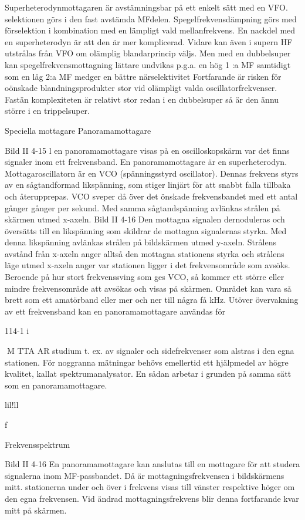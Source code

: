 Superheterodynmottagaren är avstämningsbar på ett enkelt sätt med en VFO.
selektionen görs i den fast avstämda MFdelen. Spegelfrekvensdämpning görs med
förselektion i kombination med en lämpligt
vald mellanfrekvens.
En nackdel med en superheterodyn är
att den är mer komplicerad. Vidare kan även
i supern HF utstrålas från VFO om olämplig
blandarprincip väljs.
Men med en dubbelsuper kan spegelfrekvensmottagning lättare undvikas p.g.a.
en hög 1 :a MF samtidigt som en låg 2:a MF
medger en bättre närselektivitet
Fortfarande är risken för oönskade blandningsprodukter stor vid olämpligt valda oscillatorfrekvenser.
Fastän komplexiteten är relativt stor redan i en dubbelsuper så är den ännu större
i en trippelsuper.

Speciella mottagare
Panoramamottagare

Bild II 4-15
l en panoramamottagare visas på en oscilloskopskärm var det finns signaler inom ett
frekvensband. En panoramamottagare är
en superheterodyn. Mottagaroscillatorn är
en VCO (spänningsstyrd oscillator). Dennas frekvens styrs av en sågtandformad
likspänning, som stiger linjärt för att snabbt
falla tillbaka och återupprepas. VCO sveper
då över det önskade frekvensbandet med
ett antal gånger gånger per sekund. Med
samma sågtandspänning avlänkas strålen
på skärmen utmed x-axeln. Bild II 4-16
Den mottagna signalen dernoduleras och
översätts till en likspänning som skildrar de
mottagna signalernas styrka. Med denna
likspänning avlänkas strålen på bildskärmen utmed y-axeln. Strålens avstånd från
x-axeln anger alltså den mottagna stationens styrka och strålens läge utmed x-axeln
anger var stationen ligger i det frekvensområde som avsöks. Beroende på hur stort
frekvenssving som ges VCO, så kommer ett
större eller mindre frekvensområde att
avsökas och visas på skärmen. Området
kan vara så brett som ett amatörband eller
mer och ner till några få kHz.
Utöver övervakning av ett frekvensband
kan en panoramamottagare användas för

114-1 i

M TTA AR
studium t. ex. av signaler och sidefrekvenser
som alstras i den egna stationen. För noggranna mätningar behövs emellertid ett hjälpmedel av högre kvalitet, kallat spektrumanalysator. En sådan arbetar i grunden på
samma sätt som en panoramamottagare.

lil!ll

f

Frekvensspektrum

Bild II 4-16
En panoramamottagare kan anslutas till en
mottagare för att studera signalerna inom
MF-passbandet. Då är mottagningsfrekvensen i bildskärmens mitt. stationerna under
och över i frekvens visas till vänster respektive höger om den egna frekvensen.
Vid ändrad mottagningsfrekvens blir
denna fortfarande kvar mitt på skärmen.

